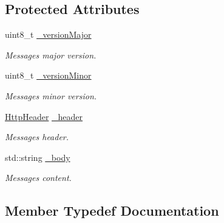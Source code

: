 \subsection*{Protected Attributes}
\begin{DoxyCompactItemize}
\item 
\mbox{\label{classZiApi_1_1HttpMessage_a980cd22bd442a6b3a01e66e9117d4c35}} 
uint8\+\_\+t \mbox{\hyperlink{classZiApi_1_1HttpMessage_a980cd22bd442a6b3a01e66e9117d4c35}{\+\_\+version\+Major}}
\begin{DoxyCompactList}\small\item\em Message\textquotesingle{}s major version. \end{DoxyCompactList}\item 
\mbox{\label{classZiApi_1_1HttpMessage_a36161a0628e2bd17d5cd1bc2da8a1448}} 
uint8\+\_\+t \mbox{\hyperlink{classZiApi_1_1HttpMessage_a36161a0628e2bd17d5cd1bc2da8a1448}{\+\_\+version\+Minor}}
\begin{DoxyCompactList}\small\item\em Message\textquotesingle{}s minor version. \end{DoxyCompactList}\item 
\mbox{\label{classZiApi_1_1HttpMessage_a649867b80ecf41e6c32170ebe206be26}} 
\mbox{\hyperlink{classZiApi_1_1HttpMessage_ae086e821289425f1c653800caf8d39d0}{Http\+Header}} \mbox{\hyperlink{classZiApi_1_1HttpMessage_a649867b80ecf41e6c32170ebe206be26}{\+\_\+header}}
\begin{DoxyCompactList}\small\item\em Message\textquotesingle{}s header. \end{DoxyCompactList}\item 
\mbox{\label{classZiApi_1_1HttpMessage_a3fa98de77c767e106b0579d43ea62c33}} 
std\+::string \mbox{\hyperlink{classZiApi_1_1HttpMessage_a3fa98de77c767e106b0579d43ea62c33}{\+\_\+body}}
\begin{DoxyCompactList}\small\item\em Message\textquotesingle{}s content. \end{DoxyCompactList}\end{DoxyCompactItemize}


\subsection{Member Typedef Documentation}
\mbox{\label{classZiApi_1_1HttpMessage_ae086e821289425f1c653800caf8d39d0}} 
